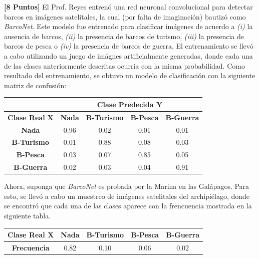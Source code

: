 \documentclass[ a4paper, twoside, 11pt]{article}
\begin{document}
\begin{problem}
\textbf{[8 Puntos]} El Prof. Reyes entren\'o una red neuronal convolucional para detectar barcos en im\'agenes satelitales, la cual (por falta de imaginaci\'on) bautiz\'o como \emph{BarcoNet}. Este modelo fue entrenado para clasificar im\'agenes de acuerdo a \textit{(i)} la ausencia de barcos, \linebreak \textit{(ii)} la presencia de barcos de turismo, \textit{(iii)} la presencia de barcos de pesca o \textit{(iv)} la presencia de barcos de guerra. El entrenamiento se llev\'o a cabo utilizando un juego de im\'agnes artificialmente generadas, donde cada una de las clases anteriormente descritas ocurr\'ia con la misma probabilidad. Como resultado del entrenamiento, se obtuvo un modelo de clasificaci\'on con la siguiente matriz de confusi\'on: 
\begin{table}[H]
\centering
\begin{tabular}{c|c|c|c|c|}
\cline{2-5}
 & \multicolumn{4}{c|}{\textbf{Clase Predecida} $\boldsymbol{Y}$} \\ \hline
\multicolumn{1}{|c|}{\textbf{Clase Real} $\boldsymbol{X}$} & \textbf{Nada} & \textbf{B-Turismo} & \textbf{B-Pesca} & \textbf{B-Guerra} \\ \hline
\multicolumn{1}{|c|}{\textbf{Nada}} & 0.96 & 0.02 & 0.01 & 0.01 \\ \hline
\multicolumn{1}{|c|}{\textbf{B-Turismo}} & 0.01 & 0.88 & 0.08 & 0.03 \\ \hline
\multicolumn{1}{|c|}{\textbf{B-Pesca}} & 0.03 & 0.07 & 0.85 & 0.05 \\ \hline
\multicolumn{1}{|c|}{\textbf{B-Guerra}} & 0.02 & 0.03 & 0.04 & 0.91 \\ \hline
\end{tabular}
\end{table}

Ahora, suponga que \emph{BarcoNet} es probada por la Marina en las Gal\'apagos. Para esto, se llev\'o a cabo un muestreo de im\'agenes satelitales del archipi\'elago, donde se encontr\'o que cada una de las clases aparece con la frencuencia mostrada en la siguiente tabla. 

\begin{table}[H]
\centering
\begin{tabular}{|c|c|c|c|c|}
\hline
\textbf{Clase Real $\boldsymbol{X}$} & \textbf{Nada} & \textbf{B-Turismo} & \textbf{B-Pesca} & \textbf{B-Guerra} \\ \hline
\textbf{Frecuencia} & 0.82 & 0.10 & 0.06 & 0.02 \\ \hline
\end{tabular}
\end{table}


\end{problem}
\end{document}
